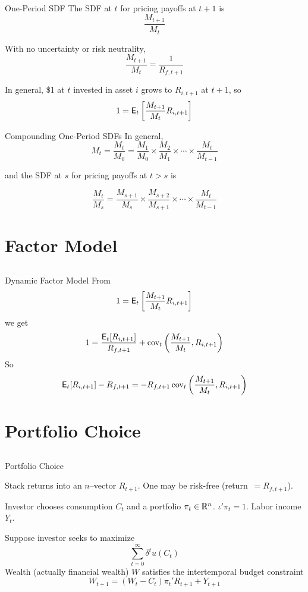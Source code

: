 \documentclass[xcolor=dvipsnames,10pt]{beamer}
\begin{document}
\begin{frame}{One-Period SDF}
The SDF at $t$ for pricing payoffs at $t+1$ is
$$\frac{M_{t+1}}{M_{t}}$$

With no uncertainty or risk neutrality,
$$\frac{M_{t+1}}{M_{t}} = \frac{1}{R_{f,t+1}}$$

In general, \$1 at $t$ invested in asset $i$ grows to $R_{i,t+1}$ at $t+1$, so
$$1 = \mathsf{E}_t\left[\frac{M_{t+1}}{M_{t}}R_{i,t+1}\right]$$
    
\end{frame}

\begin{frame}{Compounding One-Period SDFs}
      In general,
     $$M_t = \frac{M_t}{M_0} = \frac{M_{1}}{M_0} \times \frac{M_{2}}{M_{1}}\times \cdots \times \frac{M_t}{M_{t-1}} $$
     
     and the SDF at $s$ for pricing payoffs at $t>s$ is 
     
$$\frac{M_t}{M_s} = \frac{M_{s+1}}{M_s} \times \frac{M_{s+2}}{M_{s+1}}\times \cdots \times \frac{M_t}{M_{t-1}}$$


\end{frame}

\section{Factor Model}\subsection{}

\begin{frame}{Dynamic Factor Model}
From
$$ 1 = \mathsf{E}_t\left[\frac{M_{t+1}}{M_t}R_{i,t+1}\right]$$
we get
$$ 1 = \frac{\mathsf{E}_t[R_{i,t+1}]}{R_{f,t+1}} + \operatorname{cov}_t \left(\frac{M_{t+1}}{M_t},R_{i,t+1}\right)$$
So 
$$\mathsf{E}_t[R_{i,t+1}] - R_{f,t+1} = - R_{f,t+1}\operatorname{cov}_t \left(\frac{M_{t+1}}{M_t},R_{i,t+1}\right)$$

\end{frame}


\section{Portfolio Choice}\subsection{}

\begin{frame}{Portfolio Choice}

 Stack returns into an $n$--vector $R_{t+1}$.  One may be risk-free (return $\,= R_{f,t+1}$).

 Investor chooses consumption $C_t$ and a portfolio $\pi_t \in \mathbb{R}^n$. $\iota'\pi_t=1$.  Labor income $Y_t$.

Suppose investor seeks to maximize
$$\sum_{t=0}^\infty \delta^t u(C_t)$$
 Wealth (actually financial wealth) $W$ satisfies the \alert{intertemporal budget constraint}
$$W_{t+1} = (W_t-C_t)\pi_t'R_{t+1} + Y_{t+1}$$

 \end{frame}
\end{document}
